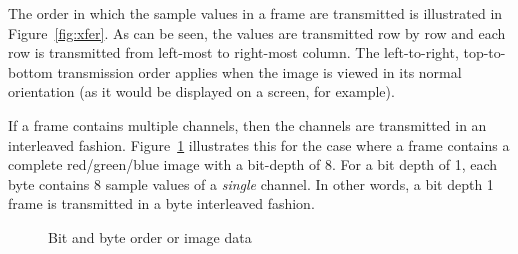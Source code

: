 \documentclass[11pt,DVIps]{report}
\begin{document}
The order in which the sample values in a frame are transmitted is
illustrated in Figure~\ref{fig:xfer}.  As can be seen, the values are
transmitted row by row and each row is transmitted from left-most to
right-most column.  The left-to-right, top-to-bottom transmission
order applies when the image is viewed in its normal orientation (as
it would be displayed on a screen, for example).

If a frame contains multiple channels, then the channels are
transmitted in an interleaved fashion.  Figure~\ref{fig:pixels}
illustrates this for the case where a frame contains a complete
red/green/blue image with a bit-depth of 8.  For a bit depth of 1,
each byte contains 8 sample values of a {\em single\/} channel.  In
other words, a bit depth 1 frame is transmitted in a byte interleaved
fashion.

\begin{figure}[htbp]
  \begin{center}
    \leavevmode
    \caption{Bit and byte order or image data}
    \label{fig:pixels}
  \end{center}
\end{figure}
\end{document}
